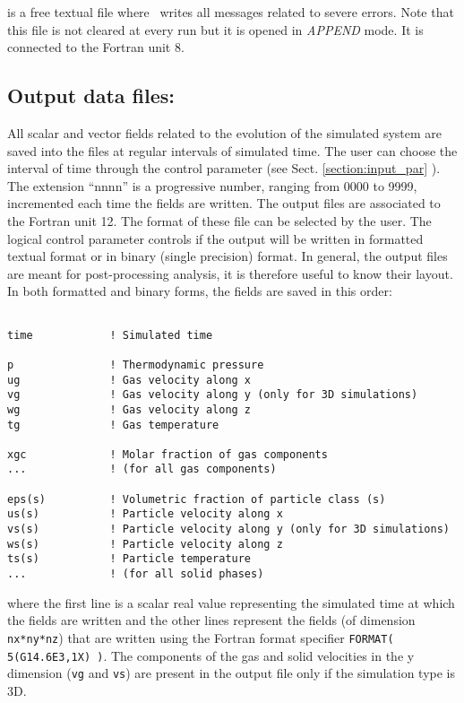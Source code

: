  is a free textual file where \PDAC\ writes all messages 
related to severe errors. Note that this file is not cleared at every 
run but it is opened in {\it APPEND} mode.
It is connected to the Fortran unit 8. 

\subsection{Output data files: }

All scalar and vector fields related to the evolution of the simulated
system are saved into the  files at regular intervals of
simulated time. The user can choose the interval of time through
the control parameter  (see Sect. \ref{section:input_par} ).
The extension ``nnnn'' is a progressive number, ranging from 0000 to 9999, 
incremented each time the fields are written. 
The output files are associated to the Fortran unit 12. 
The format of these file can be selected by the user.
The logical control parameter  controls if the
output will be written in formatted textual format
or in binary (single precision) format. In general, the output files 
are meant for post-processing analysis, it is therefore useful to know 
their layout. In both formatted and binary forms, the fields are saved
in this order:

\begin{verbatim}

time            ! Simulated time

p               ! Thermodynamic pressure
ug              ! Gas velocity along x
vg              ! Gas velocity along y (only for 3D simulations)
wg              ! Gas velocity along z
tg              ! Gas temperature

xgc             ! Molar fraction of gas components
...             ! (for all gas components)

eps(s)          ! Volumetric fraction of particle class (s)
us(s)           ! Particle velocity along x
vs(s)           ! Particle velocity along y (only for 3D simulations)
ws(s)           ! Particle velocity along z
ts(s)           ! Particle temperature
...             ! (for all solid phases)

\end{verbatim}

where the first line is a scalar real value representing the 
simulated time at which the fields are written and the other lines
represent the fields (of dimension {\tt nx*ny*nz}) that are written 
using the Fortran format specifier {\tt FORMAT( 5(G14.6E3,1X) )}.
The components of the gas and solid velocities in the y dimension
({\tt vg} and {\tt vs}) are present in the output file only if the simulation
type is 3D.

